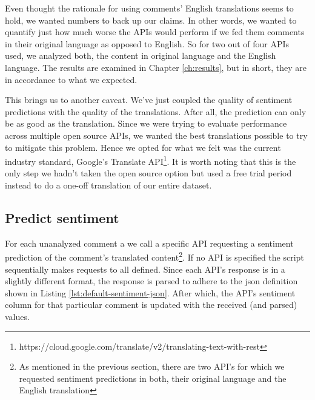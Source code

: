 Even thought the rationale for using comments' English translations seems to hold, we wanted numbers to back up our claims. In other words, we wanted to quantify just how much worse the APIs would perform if we fed them comments in their original language as opposed to English. So for two out of four APIs used, we analyzed both, the content in original language and the English language. The results are examined in Chapter \ref{ch:results}, but in short, they are in accordance to what we expected.

This brings us to another caveat. We've just coupled the quality of sentiment predictions with the quality of the translations. After all, the prediction can only be as good as the translation. Since we were trying to evaluate performance across multiple open source APIs,  we wanted the best translations possible to try to mitigate this problem. 
Hence we opted for what we felt was the current industry standard, Google's Translate API\footnote{https://cloud.google.com/translate/v2/translating-text-with-rest}.
It is worth noting that this is the only step we hadn't taken the open source option but used a free trial period instead to do a one-off translation of our entire dataset.

\subsection*{Predict sentiment\label{sec:predict-sentiment}}
For each unanalyzed comment a we call a specific API requesting a sentiment prediction of the comment's translated content\footnote{As mentioned in the previous section, there are two API's for which we requested sentiment predictions in both, their original language and the English translation}. 
If no API is specified the script sequentially makes requests to all defined.
Since each API's response is in a slightly different format, the response is parsed to adhere to the json definition shown in Listing \ref{lst:default-sentiment-json}. After which, the API's sentiment column for that particular comment is updated with the received (and parsed) values.

